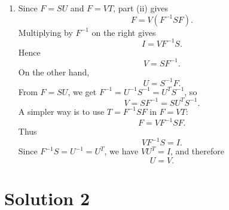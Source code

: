 \documentclass[10pt,a4paper]{article}
\begin{document}
\begin{enumerate}
\begin{enumerate}
          \item Since $F=SU$ and $F=VT$, part (ii) gives
                \[
                  F=V(F^{-1}SF).
                \]
                Multiplying by $F^{-1}$ on the right gives
                \[
                  I=VF^{-1}S.
                \]
                Hence
                \[
                  V=SF^{-1}.
                \]
                On the other hand,
                \[
                  U=S^{-1}F.
                \]
                From $F=SU$, we get $F^{-1}=U^{-1}S^{-1}=U^TS^{-1}$, so
                \[
                  V=SF^{-1}=SU^TS^{-1}.
                \]
                A simpler way is to use $T=F^{-1}SF$ in $F=VT$:
                \[
                  F=VF^{-1}SF.
                \]
                Thus
                \[
                  VF^{-1}S=I.
                \]
                Since $F^{-1}S=U^{-1}=U^T$, we have $VU^T=I$, and therefore
                \[
                  \boxed{U=V.}
                \]
        \end{enumerate}
\end{enumerate}

\section*{Solution 2}
\end{document}
